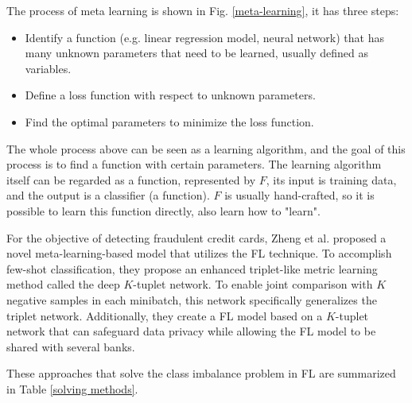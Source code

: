 \documentclass[10pt,journal,compsoc]{IEEEtran}
\begin{document}
	The process of meta learning is shown in Fig. \ref{meta-learning}, it has three steps: 
	\begin{itemize}
		\item Identify a function (e.g. linear regression model, neural network) that has many unknown parameters that need to be learned, usually defined as variables.
		\item Define a loss function with respect to unknown parameters.
		\item Find the optimal parameters to minimize the loss function.
	\end{itemize}
	
	The whole process above can be seen as a learning algorithm, and the goal of this process is to find a function with certain parameters. The learning algorithm itself can be regarded as a function, represented by $ F $, its input is training data, and the output is a classifier (a function). $ F $ is usually hand-crafted, so it is possible to learn this function directly, also learn how to "learn".
	
	For the objective of detecting fraudulent credit cards, Zheng et al. \cite{zheng2021federated} proposed a novel meta-learning-based model that utilizes the FL technique. To accomplish few-shot classification, they propose an enhanced triplet-like metric learning method called the deep $ K $-tuplet network. To enable joint comparison with $ K $ negative samples in each minibatch, this network specifically generalizes the triplet network. Additionally, they create a FL model based on a $ K $-tuplet network that can safeguard data privacy while allowing the FL model to be shared with several banks. 
	
	These approaches that solve the class imbalance problem in FL are summarized in Table \ref{solving methods}.
	
\end{document}
